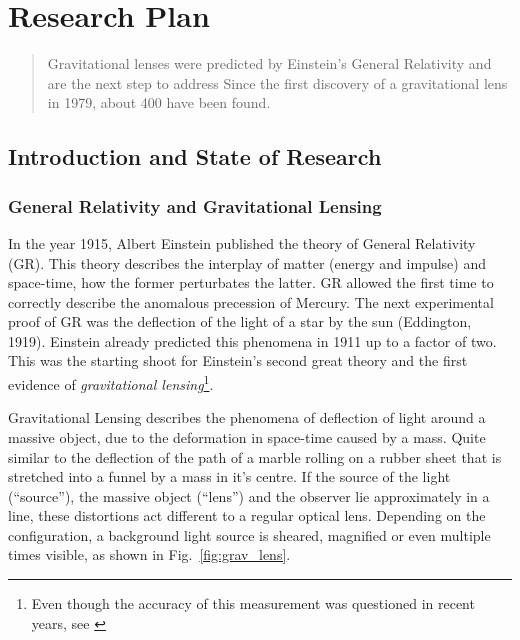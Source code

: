 \documentclass[11pt]{article}
\begin{document}
\newpage

\section*{Research Plan}

\begin{abstract}

Gravitational lenses were predicted by Einstein's General Relativity and are the next step to address 
Since the first discovery of a gravitational lens in 1979, about 400 have been found.


\end{abstract}


\subsection{Introduction and State of Research}
\label{sec:intro}

\subsubsection{General Relativity and Gravitational Lensing}

In the year 1915, Albert Einstein published the theory of General Relativity (GR).
This theory describes the interplay of matter (energy and impulse) and space-time, how the former perturbates the latter.
GR allowed the first time to correctly describe the anomalous precession of Mercury.
The next experimental proof of GR was the deflection of the light of a star by the sun (Eddington, 1919).
Einstein already predicted this phenomena in 1911 up to a factor of two.
This was the starting shoot for Einstein’s second great theory and the first evidence of \emph{gravitational lensing}\footnote{Even though the accuracy of this measurement was questioned in recent years, see \cite{kennefick2009testing}}.

Gravitational Lensing describes the phenomena of deflection of light around a massive object, due to the deformation in space-time caused by a mass.
Quite similar to the deflection of the path of a marble rolling on a rubber sheet that is stretched into a funnel by a mass in it's centre.
If the source of the light (``source''), the massive object (``lens'') and the observer lie approximately in a line, these distortions act different to a regular optical lens.
Depending on the configuration, a background light source is sheared, magnified or even multiple times visible, as shown in Fig.~\ref{fig:grav_lens}.
\end{document}
